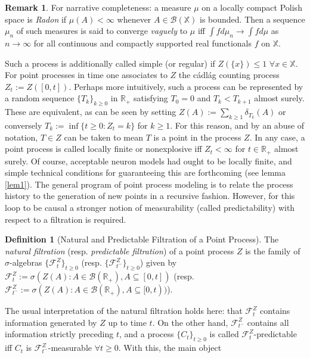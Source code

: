 \documentclass[12pt, oneside]{report}
\newcommand{\mbb}[1]{\mathbb{#1}}
\newcommand{\1}[1]{\mathbbm{1}_{\{#1\}}}
\newcommand{\mc}[1]{\mathcal{#1}}
\theoremstyle{definition}
\newtheorem{definition}[theorem]{Definition}
\newtheorem{remark}[theorem]{Remark}
\begin{document}
\begin{remark}
    For narrative completeness: a measure $\mu$ on a locally compact Polish
    space is {\it Radon} if $\mu(A)<\infty$ whenever $A\in\mc{B}(\mbb{X})$ is
    bounded. Then a sequence $\mu_n$ of such measures is said to converge {\it
    vaguely} to $\mu$ iff $\int fd\mu_n\rightarrow\int fd\mu$ as
    $n\rightarrow\infty$ for all continuous and
    compactly supported real functionals $f$ on $\mbb{X}$. 
\end{remark}
Such a process is additionally called simple (or regular) if $Z(\{x\})\leq 1$
$\forall x\in\mbb{X}$. For point processes in time one associates to $Z$ the
c\'adl\'ag counting process $Z_t:=Z([0,t])$. Perhaps more intuitively, such a
process can be represented by a random sequence $\{T_k\}_{k\geq 0}$ in
$\mbb{R}_+$ satisfying $T_0=0$ and $T_k<T_{k+1}$ almost surely. These are
equivalent, as can be seen by setting $Z(A):=\sum_{k\geq 1}\delta_{T_k}(A)$ or
conversely $T_k:=\inf\{t\geq 0: Z_t=k\}$ for $k\geq 1$. For this reason, and by
an abuse of notation, $T\in Z$ can be taken to mean $T$ is a point in the
process $Z$. In any case, a point process is called locally finite or
nonexplosive iff $Z_t<\infty$ for $t\in\mbb{R}_+$ almost surely. Of course,
acceptable neuron models had ought to be locally finite, and simple technical conditions
for guaranteeing this are forthcoming (see lemma \ref{lem1}). The general
program of point process modeling is to relate the process history to the
generation of new points in a recursive fashion. However, for this loop to be
causal a stronger notion of measurability (called predictability) with respect
to a filtration is required.
\begin{definition}[Natural and Predictable Filtration of a Point
    Process]\label{def17} The {\it natural filtration} (resp. {\it predictable
    filtration}) of a point process $Z$ is the family of $\sigma$-algebras
    $\{\mc{F}^Z_t\}_{t\geq 0}$ (resp. $\{\mc{F}^Z_{t^-}\}_{t\geq 0}$) given by
    $\mc{F}^Z_t:=\sigma(Z(A):A\in\mc{B}(\mbb{R}_+), A\subseteq[0,t])$  (resp.
    $\mc{F}^Z_{t^-}:=\sigma(Z(A):A\in\mc{B}(\mbb{R}_+), A\subseteq [0,t))$).
\end{definition}
The usual interpretation of the natural filtration holds here: that $\mc{F}^Z_t$
contains information generated by $Z$ up to time $t$. On the other hand,
$\mc{F}^Z_{t^-}$ contains all information strictly preceding $t$, and a process
$\{C_t\}_{t\geq 0}$ is called $\mc{F}^Z_t$-predictable iff $C_t$ is
$\mc{F}^Z_{t^-}$-measurable $\forall t\geq 0$. With this, the main object
\end{document}
